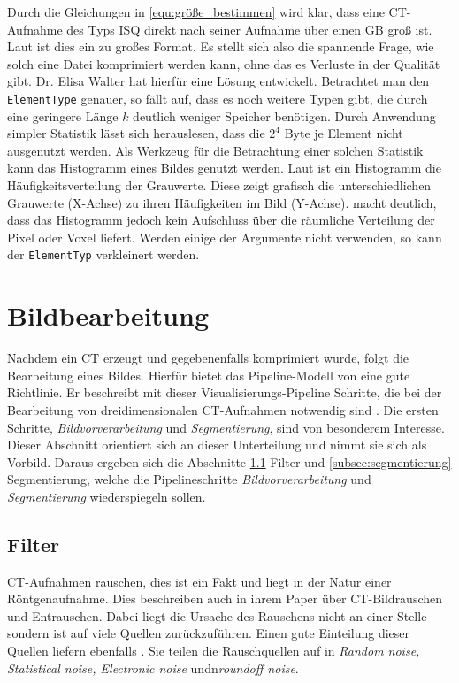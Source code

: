 Durch die Gleichungen in \ref{equ:größe_bestimmen} wird klar, dass eine \ac{CT}-Aufnahme
des Typs \ac{ISQ} direkt nach seiner Aufnahme über einen \ac{GB} groß ist. Laut
\citet{poliklinikLMU} ist dies ein zu großes Format. Es stellt sich also die
spannende Frage, wie solch eine Datei komprimiert werden kann, ohne das es
Verluste in der Qualität gibt. Dr. Elisa Walter hat hierfür eine Lösung
entwickelt. Betrachtet man den \texttt{ElementType} genauer, so fällt auf, dass
es noch weitere Typen gibt, die durch eine geringere Länge $k$ deutlich weniger Speicher
benötigen. Durch Anwendung simpler Statistik lässt sich herauslesen, dass die $2^{4}$
Byte je Element nicht ausgenutzt werden. Als Werkzeug für die Betrachtung einer
solchen Statistik kann das Histogramm eines Bildes genutzt werden. Laut \citet[Seite
249]{jahne2024} ist ein Histogramm die Häufigkeitsverteilung der Grauwerte.
Diese zeigt grafisch die unterschiedlichen Grauwerte (X-Achse) zu ihren
Häufigkeiten im Bild (Y-Achse). \citet[Seite 249]{jahne2024} macht deutlich,
dass das Histogramm jedoch kein Aufschluss über die räumliche Verteilung der
Pixel oder Voxel liefert. Werden einige der Argumente nicht verwenden, so kann
der \texttt{ElementTyp} verkleinert werden.

\section{Bildbearbeitung}
\label{sec:bildbearbeitung} Nachdem ein \ac{CT} erzeugt und gegebenenfalls
komprimiert wurde, folgt die Bearbeitung eines Bildes. Hierfür bietet das
Pipeline-Modell von \citet[Seite 50]{handels2000} eine gute Richtlinie. Er beschreibt
mit dieser Visualisierungs-Pipeline Schritte, die bei der Bearbeitung von
dreidimensionalen \ac{CT}-Aufnahmen notwendig sind \citep[vgl.][Seite 50]{handels2000}.
Die ersten Schritte, \textit{Bildvorverarbeitung} und \textit{Segmentierung},
sind von besonderem Interesse. Dieser Abschnitt orientiert sich an dieser Unterteilung
und nimmt sie sich als Vorbild. Daraus ergeben sich die Abschnitte
\ref{subsec:filter} Filter und \ref{subsec:segmentierung} Segmentierung, welche die
Pipelineschritte \textit{Bildvorverarbeitung} und \textit{Segmentierung} wiederspiegeln
sollen.

\subsection{Filter}
\label{subsec:filter} \ac{CT}-Aufnahmen rauschen, dies ist ein Fakt und liegt in
der Natur einer Röntgenaufnahme. Dies beschreiben auch \citet[Kapitel 3]{diwakar2018}
in ihrem Paper über \ac{CT}-Bildrauschen und Entrauschen. Dabei liegt die
Ursache des Rauschens nicht an einer Stelle sondern ist auf viele Quellen
zurückzuführen. Einen gute Einteilung dieser Quellen liefern ebenfalls \citet[Kapitel
3]{diwakar2018}. Sie teilen die Rauschquellen auf in \textit{Random noise, Statistical
noise, Electronic noise} undn\textit{roundoff noise}.


